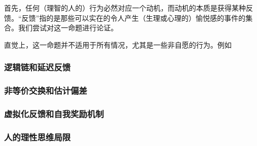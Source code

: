             首先，任何（理智的人的）行为必然对应一个动机，而动机的本质是获得某种反馈。“反馈”指的是那些可以实在的令人产生（生理或心理的）愉悦感的事件的集合。我们尝试对这一命题进行论证。

            直觉上，这一命题并不适用于所有情况，尤其是一些非自愿的行为。例如
        
        \subsubsection*{逻辑链和延迟反馈}

        \subsubsection*{非等价交换和估计偏差}

        \subsubsection*{虚拟化反馈和自我奖励机制}

        \subsubsection*{人的理性思维局限}